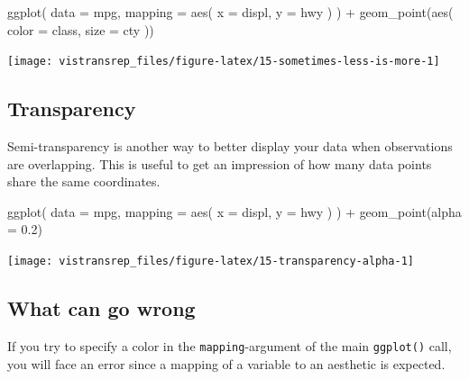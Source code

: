 \documentclass[]{book}
\newenvironment{Shaded}{}{}
\newcommand{\DataTypeTok}[1]{#1}
\newcommand{\FloatTok}[1]{#1}
\newcommand{\KeywordTok}[1]{\textcolor[rgb]{0.00,0.00,1.00}{#1}}
\newcommand{\NormalTok}[1]{#1}
\newcommand{\OperatorTok}[1]{#1}
\newcommand{\StringTok}[1]{\textcolor[rgb]{0.00,0.50,0.50}{#1}}
\begin{document}
\begin{Shaded}
\begin{Highlighting}[]
\KeywordTok{ggplot}\NormalTok{(}
  \DataTypeTok{data =}\NormalTok{ mpg,}
  \DataTypeTok{mapping =} \KeywordTok{aes}\NormalTok{(}
    \DataTypeTok{x =}\NormalTok{ displ,}
    \DataTypeTok{y =}\NormalTok{ hwy}
\NormalTok{  )}
\NormalTok{) }\OperatorTok{+}
\StringTok{  }\KeywordTok{geom_point}\NormalTok{(}\KeywordTok{aes}\NormalTok{(}
    \DataTypeTok{color =}\NormalTok{ class,}
    \DataTypeTok{size =}\NormalTok{ cty}
\NormalTok{  ))}
\end{Highlighting}
\end{Shaded}

\begin{flushright}\texttt{[image: vistransrep\_files/figure-latex/15-sometimes-less-is-more-1]} \end{flushright}

\hypertarget{transparency}{%
\subsection{Transparency}\label{transparency}}

Semi-transparency is another way to better display your data when observations are overlapping.
This is useful to get an impression of how many data points share the same coordinates.

\begin{Shaded}
\begin{Highlighting}[]
\KeywordTok{ggplot}\NormalTok{(}
  \DataTypeTok{data =}\NormalTok{ mpg,}
  \DataTypeTok{mapping =} \KeywordTok{aes}\NormalTok{(}
    \DataTypeTok{x =}\NormalTok{ displ,}
    \DataTypeTok{y =}\NormalTok{ hwy}
\NormalTok{  )}
\NormalTok{) }\OperatorTok{+}
\StringTok{  }\KeywordTok{geom_point}\NormalTok{(}\DataTypeTok{alpha =} \FloatTok{0.2}\NormalTok{)}
\end{Highlighting}
\end{Shaded}

\begin{flushright}\texttt{[image: vistransrep\_files/figure-latex/15-transparency-alpha-1]} \end{flushright}

\hypertarget{what-can-go-wrong}{%
\subsection{What can go wrong}\label{what-can-go-wrong}}

If you try to specify a color in the \texttt{mapping}-argument of the main \texttt{ggplot()} call, you will face an error since a mapping of a variable to an aesthetic is expected.
\end{document}
